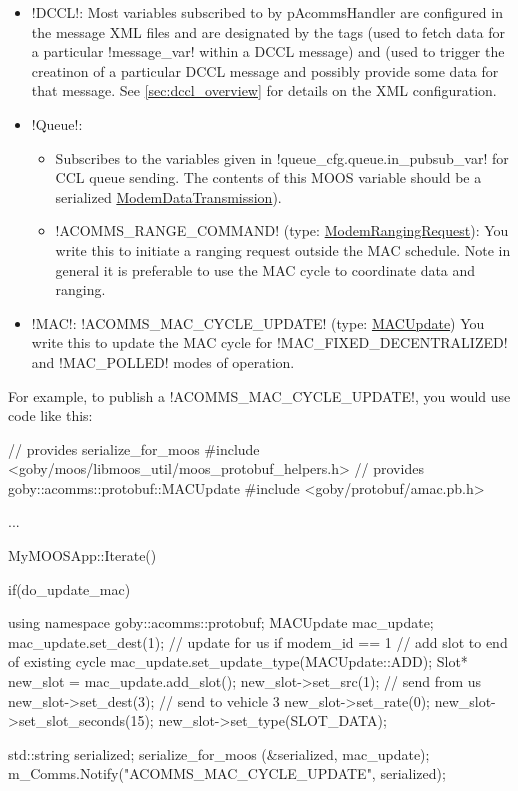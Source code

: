 \begin{itemize}
\item !DCCL!: Most variables subscribed to by pAcommsHandler are configured in the message XML files and are designated by the tags  (used to fetch data for a particular !message_var! within a DCCL message) and  (used to trigger the creatinon of a particular DCCL message and possibly provide some data for that message. See \ref{sec:dccl_overview} for details on the XML configuration. 
\item !Queue!:
\begin{itemize}
\item Subscribes to the variables given in !queue_cfg.queue.in_pubsub_var! for CCL queue sending. The contents of this MOOS variable should be a serialized \href{http://gobysoft.com/doc/modem__message_8proto_source.html}{ModemDataTransmission}). 
\item !ACOMMS_RANGE_COMMAND! (type: \href{http://gobysoft.com/doc/modem__message_8proto_source.html}{ModemRangingRequest}): You write this to initiate a ranging request outside the MAC schedule. Note in general it is preferable to use the MAC cycle to coordinate data and ranging.
\end{itemize}
\item !MAC!: !ACOMMS_MAC_CYCLE_UPDATE! (type: \href{http://gobysoft.com/doc/amac_8proto_source.html}{MACUpdate}) You write this to update the MAC cycle for !MAC_FIXED_DECENTRALIZED! and !MAC_POLLED! modes of operation.
\end{itemize}

For example, to publish a !ACOMMS_MAC_CYCLE_UPDATE!, you would use code like this:
\begin{boxedverbatim}
// provides serialize_for_moos
#include <goby/moos/libmoos_util/moos_protobuf_helpers.h>
// provides goby::acomms::protobuf::MACUpdate
#include <goby/protobuf/amac.pb.h>

...

MyMOOSApp::Iterate()
{
  if(do_update_mac)
  { 
    using namespace goby::acomms::protobuf;
    MACUpdate mac_update;
    mac_update.set_dest(1); // update for us if modem_id == 1
    // add slot to end of existing cycle
    mac_update.set_update_type(MACUpdate::ADD);
    Slot* new_slot = mac_update.add_slot();
    new_slot->set_src(1);  // send from us
    new_slot->set_dest(3); // send to vehicle 3
    new_slot->set_rate(0);
    new_slot->set_slot_seconds(15);
    new_slot->set_type(SLOT_DATA);
    
    std::string serialized;
    serialize_for_moos (&serialized, mac_update);
    m_Comms.Notify("ACOMMS_MAC_CYCLE_UPDATE", serialized);
  }
}
\end{boxedverbatim}
\resetbvlinenumber

